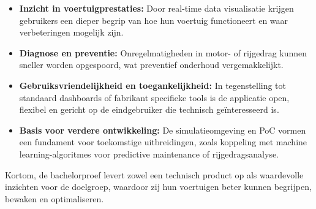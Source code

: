 \begin{itemize}
    \item \textbf{Inzicht in voertuigprestaties:} Door real-time data visualisatie krijgen gebruikers een dieper begrip van hoe hun voertuig functioneert en waar verbeteringen mogelijk zijn.
    \item \textbf{Diagnose en preventie:} Onregelmatigheden in motor- of rijgedrag kunnen sneller worden opgespoord, wat preventief onderhoud vergemakkelijkt.
    \item \textbf{Gebruiksvriendelijkheid en toegankelijkheid:} In tegenstelling tot standaard dashboards of fabrikant specifieke tools is de applicatie open, flexibel en gericht op de eindgebruiker die technisch geïnteresseerd is.
    \item \textbf{Basis voor verdere ontwikkeling:} De simulatieomgeving en PoC vormen een fundament voor toekomstige uitbreidingen, zoals koppeling met machine learning-algoritmes voor predictive maintenance of rijgedragsanalyse.
\end{itemize}

Kortom, de bachelorproef levert zowel een technisch product op als waardevolle inzichten voor de doelgroep, waardoor zij hun voertuigen beter kunnen begrijpen, bewaken en optimaliseren.

